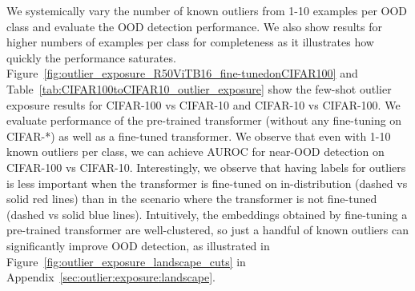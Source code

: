 \documentclass{article}
\begin{document}
\begin{center}
\vspace{-1em}
\end{center}



We systemically vary the number of known outliers from 1-10 examples per OOD class and evaluate the OOD detection performance. We also show results for higher numbers of examples per class for completeness as it illustrates how quickly the performance saturates. 
 Figure~\ref{fig:outlier_exposure_R50ViTB16_fine-tunedonCIFAR100} and Table~\ref{tab:CIFAR100toCIFAR10_outlier_exposure} show the few-shot outlier exposure results for CIFAR-100 vs CIFAR-10 and CIFAR-10 vs CIFAR-100. We evaluate performance of the pre-trained transformer (without any fine-tuning on CIFAR-*) as well as a fine-tuned transformer. We observe that even with 1-10 known outliers per class, we can achieve  AUROC for near-OOD detection on CIFAR-100 vs CIFAR-10. 
 Interestingly, we observe that having labels for outliers is less important when the transformer is fine-tuned on in-distribution (dashed vs solid red lines) than in the scenario where the transformer is not fine-tuned (dashed vs solid blue lines). 
 Intuitively, the embeddings obtained by fine-tuning a pre-trained transformer are well-clustered, so just a handful of known outliers can significantly improve OOD detection, as illustrated in  
 Figure~\ref{fig:outlier_exposure_landscape_cuts} in Appendix~\ref{sec:outlier:exposure:landscape}. 
\end{document}
